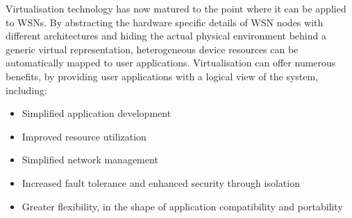 \bigskip
Virtualisation technology has now matured to the point where it can be applied to WSNs. By abstracting the hardware specific details of WSN nodes with different architectures and hiding the actual physical environment behind a generic virtual representation, heterogeneous device resources can be automatically mapped to user applications. Virtualisation can offer numerous benefits, by providing user applications with a logical view of the system, including:

\begin{itemize}
	\item Simplified application development
	\item Improved resource utilization
	\item Simplified network management
	\item Increased fault tolerance and enhanced security through isolation
	\item Greater flexibility, in the shape of application compatibility and portability
	
\end{itemize}
 
